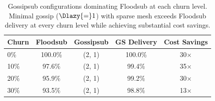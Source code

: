 \begin{table}[t]
      \centering
      \small
      \renewcommand{\arraystretch}{0.85}
      \caption{Gossipsub configurations dominating Floodsub at each churn level.
            Minimal gossip ($\Dlazy{=}1$) with sparse mesh exceeds Floodsub delivery
            at every churn level while achieving substantial cost savings.}
      \label{tab:dominance-by-churn}
      \begin{tabular}{lcccc}
            \toprule
            \textbf{Churn} & \textbf{Floodsub} & \textbf{Gossipsub} & \textbf{GS Delivery} & \textbf{Cost Savings} \\
            \midrule
            0\%            & 100.0\%           & (2, 1)             & 100.0\%              & 30$\times$            \\
            10\%           & 97.6\%            & (2, 1)             & 99.4\%               & 35$\times$            \\
            20\%           & 95.9\%            & (2, 1)             & 99.2\%               & 30$\times$            \\
            30\%           & 93.5\%            & (2, 1)             & 98.8\%               & 13$\times$            \\
            \bottomrule
      \end{tabular}
\end{table}
